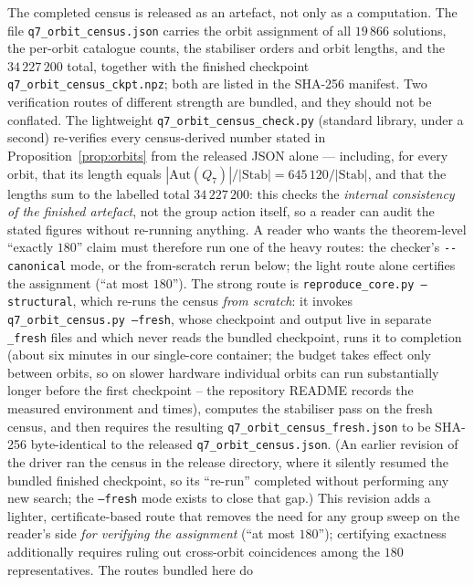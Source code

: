 \documentclass[12pt]{article}
\begin{document}
The completed census is released as an artefact, not only as a computation.
The file \texttt{q7\_orbit\_census.json} carries the orbit assignment of all
$19\,866$ solutions, the per-orbit catalogue counts, the stabiliser orders
and orbit lengths, and the $34\,227\,200$ total, together with the finished
checkpoint \texttt{q7\_orbit\_census\_ckpt.npz}; both are listed in the
SHA-256 manifest. Two verification routes of different strength are
bundled, and they should not be conflated. The lightweight
\texttt{q7\_orbit\_census\_check.py} (standard library, under a second)
re-verifies every census-derived number stated in
Proposition~\ref{prop:orbits} from the released JSON alone --- including,
for every orbit, that its length equals
$|\mathrm{Aut}(Q_7)|/|\mathrm{Stab}|=645\,120/|\mathrm{Stab}|$, and that
the lengths sum to the labelled total $34\,227\,200$: this checks
the \emph{internal consistency of the finished artefact}, not the group
action itself, so a reader can audit the stated figures without re-running
anything. A reader who wants the theorem-level ``exactly $180$'' claim
must therefore run one of the heavy routes: the checker's
\texttt{-{}-canonical} mode, or the from-scratch rerun below; the light
route alone certifies the assignment (``at most $180$'').
The strong route is \texttt{reproduce\_core.py --structural},
which re-runs the census \emph{from scratch}: it invokes
\texttt{q7\_orbit\_census.py --fresh}, whose checkpoint and output live
in separate \texttt{\_fresh} files and which never reads the bundled
checkpoint, runs it to completion (about six minutes in our single-core
container; the budget takes effect only between orbits, so on slower
hardware individual orbits can run substantially longer before the first
checkpoint -- the repository README records the measured environment and
times), computes the stabiliser pass on the fresh census, and then
requires the resulting \texttt{q7\_orbit\_census\_fresh.json} to be
SHA-256 byte-identical to the released \texttt{q7\_orbit\_census.json}.
(An earlier revision of the driver ran the census in the release directory,
where it silently resumed the bundled finished checkpoint, so its
``re-run'' completed without performing any new search; the
\texttt{--fresh} mode exists to close that gap.) This revision adds a
lighter, certificate-based route that removes the need for any group sweep
on the reader's side \emph{for verifying the assignment} (``at most
$180$''); certifying exactness additionally requires ruling out cross-orbit
coincidences among the $180$ representatives. The routes bundled here do
\end{document}
